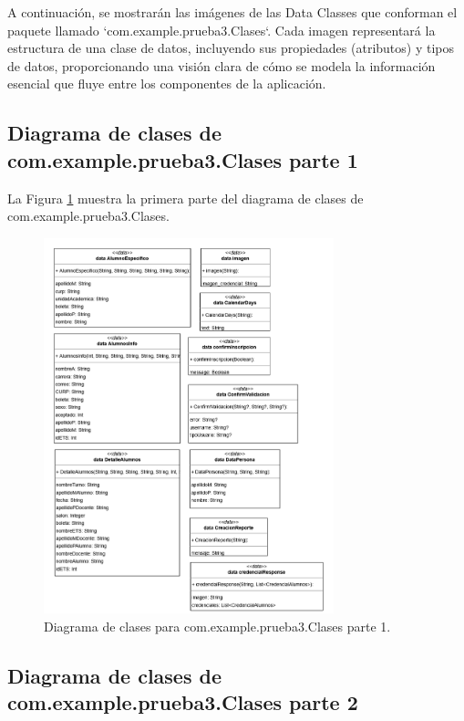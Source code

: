 A continuación, se mostrarán las imágenes de las Data Classes que conforman el paquete llamado `com.example.prueba3.Clases`. Cada imagen representará la estructura de una clase de datos, incluyendo sus propiedades (atributos) y tipos de datos, proporcionando una visión clara de cómo se modela la información esencial que fluye entre los componentes de la aplicación.

\newpage

\subsection{Diagrama de clases de com.example.prueba3.Clases parte 1}

La Figura \ref{fig:Clases1} muestra la primera parte del diagrama de clases de com.example.prueba3.Clases.

\begin{figure}[htbp!]
	\begin{center}
		\includegraphics[width=0.75\textwidth]{DiagramasMoviles/DCM (2)}
		\caption{Diagrama de clases para com.example.prueba3.Clases parte 1.}
		\label{fig:Clases1}
	\end{center}
\end{figure}

\newpage

\subsection{Diagrama de clases de com.example.prueba3.Clases parte 2}

